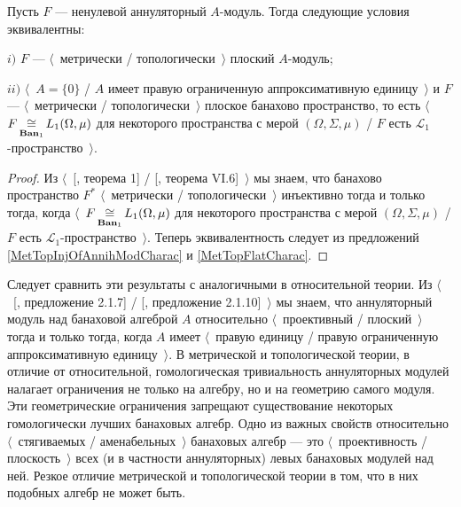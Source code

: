 \begin{proposition}\label{MetTopFlatAnnihModCharac} Пусть $F$ --- ненулевой аннуляторный $A$-модуль. Тогда следующие условия эквивалентны:

$i)$ $F$ --- $\langle$~метрически / топологически~$\rangle$ плоский $A$-модуль;

$ii)$ $\langle$~$A=\{0\}$ / $A$ имеет правую ограниченную аппроксимативную единицу~$\rangle$ и $F$ --- $\langle$~метрически / топологически~$\rangle$ плоское банахово пространство, то есть $\langle$~$F\mathop{\mathbin{\cong}}\limits_{\mathbf{Ban}_1}L_1(\Omega,\mu)$ для некоторого пространства с мерой $(\Omega, \Sigma, \mu)$ / $F$ есть $\mathscr{L}_1$-пространство~$\rangle$.
\end{proposition}
\begin{proof} Из $\langle$~[\cite{GrothMetrProjFlatBanSp}, теорема 1] / [\cite{StegRethNucOpL1LInfSp}, теорема VI.6]~$\rangle$ мы знаем, что банахово пространство $F^*$ $\langle$~метрически / топологически~$\rangle$ инъективно тогда и только тогда, когда $\langle$~$F\mathop{\mathbin{\cong}}\limits_{\mathbf{Ban}_1}L_1(\Omega,\mu)$ для некоторого пространства с мерой $(\Omega, \Sigma, \mu)$ / $F$ есть $\mathscr{L}_1$-пространство~$\rangle$. Теперь эквивалентность следует из предложений \ref{MetTopInjOfAnnihModCharac} и \ref{MetTopFlatCharac}.
\end{proof}

Следует сравнить эти результаты с аналогичными в относительной теории. Из $\langle$~[\cite{RamsHomPropSemgroupAlg}, предложение 2.1.7] / [\cite{RamsHomPropSemgroupAlg}, предложение 2.1.10]~$\rangle$ мы знаем, что аннуляторный модуль над банаховой алгеброй $A$  относительно $\langle$~проективный / плоский~$\rangle$ тогда и только тогда, когда $A$ имеет  $\langle$~правую единицу / правую ограниченную аппроксимативную единицу~$\rangle$. В метрической и топологической теории, в отличие от относительной, гомологическая тривиальность аннуляторных модулей налагает ограничения не только на алгебру, но и на геометрию самого модуля. Эти геометрические ограничения запрещают существование некоторых гомологически лучших банаховых алгебр. Одно из важных свойств относительно $\langle$~стягиваемых / аменабельных~$\rangle$ банаховых алгебр --- это $\langle$~проективность / плоскость~$\rangle$ всех (и в частности аннуляторных) левых банаховых модулей над ней. Резкое отличие метрической и топологической теории в том, что в них подобных алгебр не может быть.

